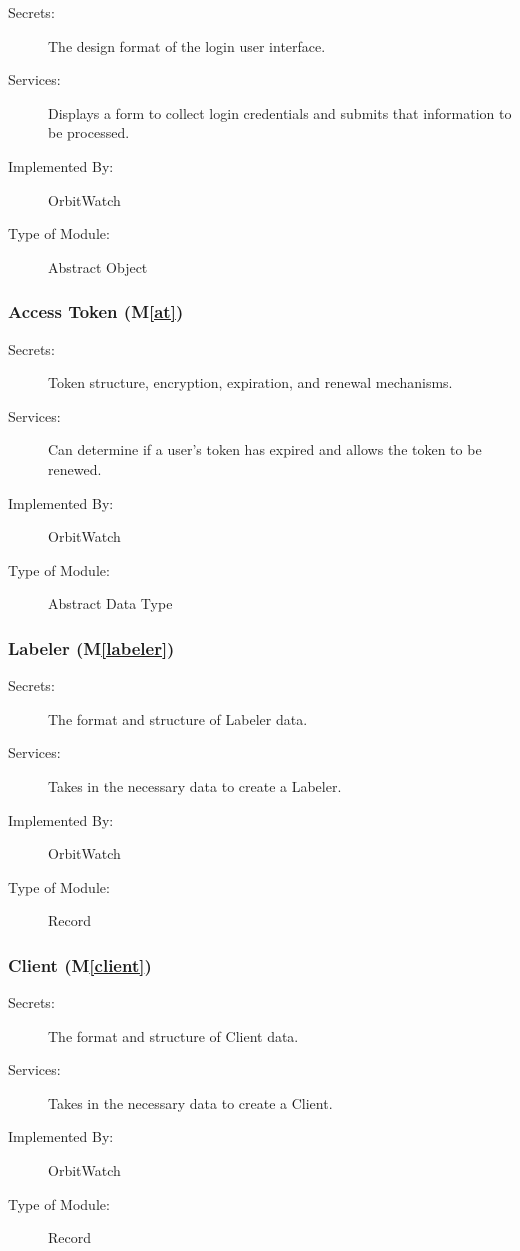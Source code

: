 \documentclass[12pt, titlepage]{article}
\newcommand{\mref}[1]{M\ref{#1}}
\begin{document}
\begin{description}
\item[Secrets:]The design format of the login user interface.
\item[Services:] Displays a form to collect login credentials and submits that information to be processed.
\item[Implemented By:] OrbitWatch
\item[Type of Module:] Abstract Object
\end{description}

\subsubsection{Access Token (\mref{at})}

\begin{description}
\item[Secrets:] Token structure, encryption, expiration, and renewal mechanisms.
\item[Services:] Can determine if a user's token has expired and allows the token to be renewed.
\item[Implemented By:] OrbitWatch
\item[Type of Module:] Abstract Data Type
\end{description}

\subsubsection{Labeler (\mref{labeler})}

\begin{description}
\item[Secrets:]The format and structure of Labeler data.
\item[Services:] Takes in the necessary data to create a Labeler.
\item[Implemented By:] OrbitWatch
\item[Type of Module:] Record
\end{description}

\subsubsection{Client (\mref{client})}

\begin{description}
\item[Secrets:]The format and structure of Client data.
\item[Services:] Takes in the necessary data to create a Client.
\item[Implemented By:] OrbitWatch
\item[Type of Module:] Record
\end{description}
\end{document}
